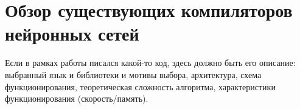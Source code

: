 \section{Обзор существующих компиляторов нейронных сетей}
\label{sec:Chapter4} 

Если в рамках работы писался какой-то код, здесь должно быть его
описание: выбранный язык и библиотеки и мотивы выбора, архитектура,
схема функционирования, теоретическая сложность алгоритма, характеристики
функционирования (скорость/память).

\newpage
